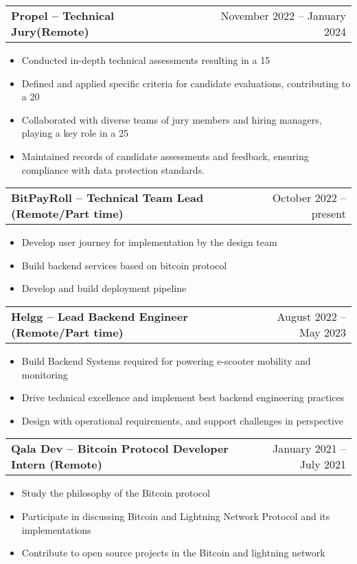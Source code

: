 \documentclass[a4paper,12pt]{article}
\makeatletter
\newenvironment{joblong}[2]
    {
    \begin{tabularx}{\linewidth}{@{}l X r@{}}
    \textbf{#1} & \hfill &  #2 \\[3.75pt]
    \end{tabularx}
    \begin{minipage}[t]{\linewidth}
    \begin{itemize}[nosep,after=\strut, leftmargin=1em, itemsep=3pt,label=--]
    }
    {
    \end{itemize}
    \end{minipage}    
    }
\makeatother
\begin{document}
\begin{joblong}{Propel -- Technical Jury(Remote)}{November 2022 -- January 2024}
\item Conducted in-depth technical assessments resulting in a 15%
\item Defined and applied specific criteria for candidate evaluations, contributing to a 20%
\item Collaborated with diverse teams of jury members and hiring managers, playing a key role in a 25%
\item Maintained records of candidate assessments and feedback, ensuring compliance with data protection standards.
\end{joblong}

\begin{joblong}{BitPayRoll -- Technical Team Lead (Remote/Part time)}{October 2022 -- present}
\item Develop user journey for implementation by the design team
\item Build backend services based on bitcoin protocol
\item Develop and build deployment pipeline
\end{joblong}

\begin{joblong}{Helgg -- Lead Backend Engineer (Remote/Part time)}{August 2022 -- May 2023}
\item Build Backend Systems required for powering e-scooter mobility and monitoring
\item Drive technical excellence and implement best backend engineering practices
\item Design with operational requirements, and support challenges in perspective
\end{joblong}

\begin{joblong}{Qala Dev -- Bitcoin Protocol Developer Intern (Remote)}{January 2021 -- July 2021}
\item Study the philosophy of the Bitcoin protocol
\item Participate in discussing Bitcoin and Lightning Network Protocol and its implementations
\item Contribute to open source projects in the Bitcoin and lightning network
\end{joblong}
\end{document}
